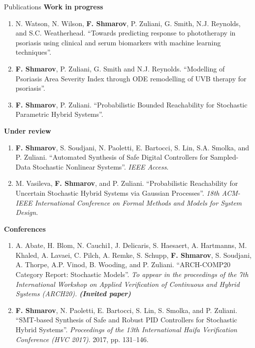 \documentclass{resume} %
\begin{document}
\begin{rSection}{Publications}
{\bf Work in progress}
\begin{enumerate}
	\item N. Watson, N. Wilson, {\bf F. Shmarov}, P. Zuliani, G. Smith, N.J. Reynolds, and S.C. Weatherhead. 
	``Towards predicting response to phototherapy in psoriasis using clinical and serum biomarkers 
	with machine learning techniques''.

	\item {\bf F. Shmarov}, P. Zuliani, G. Smith and N.J. Reynolds. 
	``Modelling of Psoriasis Area Severity Index through ODE remodelling of UVB therapy for psoriasis''.

	\item {\bf F. Shmarov}, P. Zuliani.
	``Probabilistic Bounded Reachability for Stochastic Parametric Hybrid Systems''.
\end{enumerate}


{\bf Under review}
\begin{enumerate}[resume]
	\item {\bf F. Shmarov}, S. Soudjani, N. Paoletti, E. Bartocci, S. Lin, S.A. Smolka, and P. Zuliani.
	``Automated Synthesis of Safe Digital Controllers for Sampled-Data Stochastic Nonlinear Systems''.
	{\em IEEE Access}.

	\item M. Vasileva, {\bf F. Shmarov}, and P. Zuliani.
	``Probabilistic Reachability for Uncertain Stochastic Hybrid Systems via Gaussian Processes''.
	{\em 18th ACM-IEEE International Conference on Formal Methods and Models for System Design}.
\end{enumerate}


{\bf Conferences}
\begin{enumerate}[resume]
	\item A. Abate, H. Blom, N. Cauchi1, J. Delicaris, S. Haesaert, A. Hartmanns, M. Khaled, A. Lavaei,
	C. Pilch, A. Remke, S. Schupp, {\bf F. Shmarov}, S. Soudjani, A. Thorpe, A.P. Vinod, B. Wooding, 
	and P. Zuliani. ``ARCH-COMP20 Category Report: Stochastic Models''. 
	{\em To appear in the proceedings of the 7th International Workshop on Applied 
	Verification of Continuous and Hybrid Systems (ARCH20).} {\bf {\em (Invited paper)}}

	\item {\bf F. Shmarov}, N. Paoletti, E. Bartocci, S. Lin, S. Smolka, and P. Zuliani. 
	``SMT-based Synthesis of Safe and Robust PID Controllers for Stochastic Hybrid Systems''.
	{\em Proceedings of the 13th International Haifa Verification Conference (HVC 2017)}. 2017, pp. 131--146.


\end{enumerate}
\end{rSection}
\end{document}
